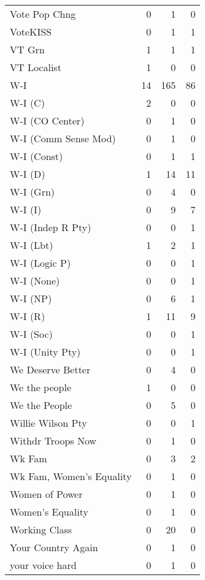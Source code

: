 \begin{supertabular}{lrrr}
Vote Pop Chng & 0 & 1 & 0\\
VoteKISS & 0 & 1 & 1\\
VT Grn & 1 & 1 & 1\\
VT Localist & 1 & 0 & 0\\
W-I & 14 & 165 & 86\\
W-I (C) & 2 & 0 & 0\\
W-I (CO Center) & 0 & 1 & 0\\
W-I (Comm Sense Mod) & 0 & 1 & 0\\
W-I (Const) & 0 & 1 & 1\\
W-I (D) & 1 & 14 & 11\\
W-I (Grn) & 0 & 4 & 0\\
W-I (I) & 0 & 9 & 7\\
W-I (Indep R Pty) & 0 & 0 & 1\\
W-I (Lbt) & 1 & 2 & 1\\
W-I (Logic P) & 0 & 0 & 1\\
W-I (None) & 0 & 0 & 1\\
W-I (NP) & 0 & 6 & 1\\
W-I (R) & 1 & 11 & 9\\
W-I (Soc) & 0 & 0 & 1\\
W-I (Unity Pty) & 0 & 0 & 1\\
We Deserve Better & 0 & 4 & 0\\
We the people & 1 & 0 & 0\\
We the People & 0 & 5 & 0\\
Willie Wilson Pty & 0 & 0 & 1\\
Withdr Troops Now & 0 & 1 & 0\\
Wk Fam & 0 & 3 & 2\\
Wk Fam, Women's Equality & 0 & 1 & 0\\
Women of Power & 0 & 1 & 0\\
Women's Equality & 0 & 1 & 0\\
Working Class & 0 & 20 & 0\\
Your Country Again & 0 & 1 & 0\\
your voice hard & 0 & 1 & 0\\
\bottomrule
\end{supertabular}
